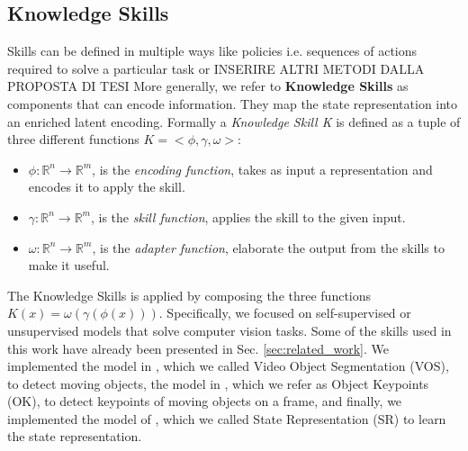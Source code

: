 \subsection{Knowledge Skills}
\label{sec:skills}
Skills can be defined in multiple ways like policies i.e. sequences of actions required to solve a particular task or INSERIRE ALTRI METODI DALLA PROPOSTA DI TESI
More generally, we refer to \textbf{Knowledge Skills} as components that can encode information. They map the state representation into an enriched latent encoding.
Formally a \textit{Knowledge Skill K} is defined as a tuple of three different functions $K=<\phi, \gamma, \omega>$:
\begin{itemize}
    \item $\phi: \mathbb{R}^{n} \rightarrow \mathbb{R}^{m}$, is the \textit{encoding function}, takes as input a representation and encodes it to apply the skill.

    \item $\gamma: \mathbb{R}^{n} \rightarrow \mathbb{R}^{m}$, is the \textit{skill function}, applies the skill to the given input.

    \item $\omega: \mathbb{R}^{n} \rightarrow \mathbb{R}^{m}$, is the \textit{adapter function}, elaborate the output from the skills to make it useful.
\end{itemize}
The Knowledge Skills is applied by composing the three functions $K(x) = \omega (\gamma ( \phi(x)))$.
Specifically, we focused on self-supervised or unsupervised models that solve computer vision tasks. Some of the skills used in this work have already been presented in Sec. \ref{sec:related_work}. We implemented the model in \cite{goel2018unsupervised}, which we called Video Object Segmentation (VOS), to detect moving objects, the model in \cite{kulkarni2019unsupervised}, which we refer as Object Keypoints (OK), to detect keypoints of moving objects on a frame, and finally, we implemented the model of \cite{anand2019unsupervised}, which we called State Representation (SR) to learn the state representation. %


